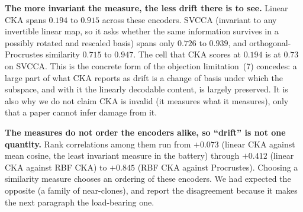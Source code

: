 \begin{table}[ht]
\centering
\caption{\textbf{Six measures of representation change on 59 Moirai-Small
encoders.} All computed on identical windows and identical pooling. ``$\rho$ with
CKA'' is the rank correlation of each measure with linear CKA over the 59
encoders; the last two columns correlate each measure with forgetting, pooled and
then within each of the six groups of at least five encoders. Forgetting here is
the \emph{selection-split} figure: these runs stored no zero-shot test MSE, so a
held-out contrast cannot be reconstructed from them, and
\S\ref{sec:analysis:heldout} shows same-split scoring can invert the sign of the
intervention. This arm is therefore a comparison of measures, not a held-out
claim. Emitted by \texttt{scripts/drift\_metric\_battery.py}; the pooled column
mixes three datasets and is descriptive for the reason
Appendix~\ref{app:crosscell} gives about pooling.}
\label{tab:driftmetrics}

\end{table}

\textbf{The more invariant the measure, the less drift there is to see.} Linear
CKA spans $0.194$ to $0.915$ across these encoders. SVCCA (invariant to any
invertible linear map, so it asks whether the same information survives in a
possibly rotated and rescaled basis) spans only $0.726$ to $0.939$, and
orthogonal-Procrustes similarity $0.715$ to $0.947$. The cell that CKA scores at
$0.194$ is at $0.73$ on SVCCA. This is the concrete form of the objection
limitation~(7) concedes: a large part of what CKA reports as drift is a change of
basis under which the subspace, and with it the linearly decodable content, is
largely preserved. It is also why we do not claim CKA is invalid (it measures
what it measures), only that a paper cannot infer damage from it.

\textbf{The measures do not order the encoders alike, so ``drift'' is not one
quantity.} Rank correlations among them run from $+0.073$ (linear CKA against
mean cosine, the least invariant measure in the battery) through $+0.412$ (linear
CKA against RBF CKA) to $+0.845$ (RBF CKA against Procrustes). Choosing a
similarity measure chooses an ordering of these encoders. We had expected the
opposite (a family of near-clones), and report the disagreement because it makes
the next paragraph the load-bearing one.

